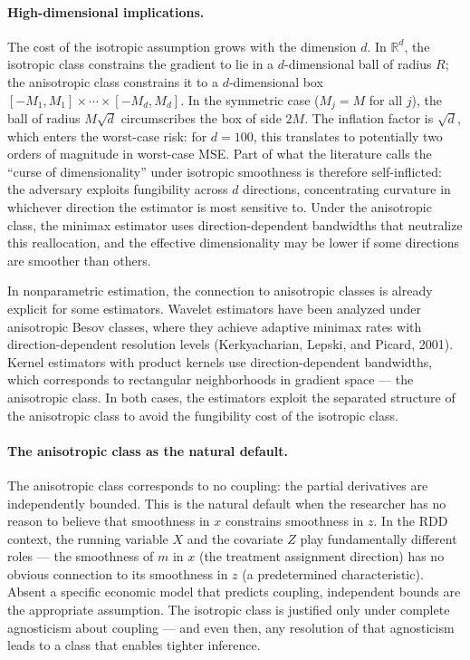 \paragraph{High-dimensional implications.}
The cost of the isotropic assumption grows with the dimension $d$.
In $\mathbb{R}^d$, the isotropic class constrains the gradient to lie in a $d$-dimensional ball of radius $R$; the anisotropic class constrains it to a $d$-dimensional box $[-M_1, M_1] \times \cdots \times [-M_d, M_d]$.
In the symmetric case ($M_j = M$ for all $j$), the ball of radius $M\sqrt{d}$ circumscribes the box of side $2M$.
The inflation factor is $\sqrt{d}$, which enters the worst-case risk: for $d = 100$, this translates to potentially two orders of magnitude in worst-case MSE.
Part of what the literature calls the ``curse of dimensionality'' under isotropic smoothness is therefore self-inflicted: the adversary exploits fungibility across $d$ directions, concentrating curvature in whichever direction the estimator is most sensitive to.
Under the anisotropic class, the minimax estimator uses direction-dependent bandwidths that neutralize this reallocation, and the effective dimensionality may be lower if some directions are smoother than others.

In nonparametric estimation, the connection to anisotropic classes is already explicit for some estimators.
Wavelet estimators have been analyzed under anisotropic Besov classes, where they achieve adaptive minimax rates with direction-dependent resolution levels (Kerkyacharian, Lepski, and Picard, 2001).
Kernel estimators with product kernels use direction-dependent bandwidths, which corresponds to rectangular neighborhoods in gradient space --- the anisotropic class.
In both cases, the estimators exploit the separated structure of the anisotropic class to avoid the fungibility cost of the isotropic class.

\paragraph{The anisotropic class as the natural default.}
The anisotropic class corresponds to no coupling: the partial derivatives are independently bounded.
This is the natural default when the researcher has no reason to believe that smoothness in $x$ constrains smoothness in $z$.
In the RDD context, the running variable $X$ and the covariate $Z$ play fundamentally different roles --- the smoothness of $m$ in $x$ (the treatment assignment direction) has no obvious connection to its smoothness in $z$ (a predetermined characteristic).
Absent a specific economic model that predicts coupling, independent bounds are the appropriate assumption.
The isotropic class is justified only under complete agnosticism about coupling --- and even then, any resolution of that agnosticism leads to a class that enables tighter inference.


